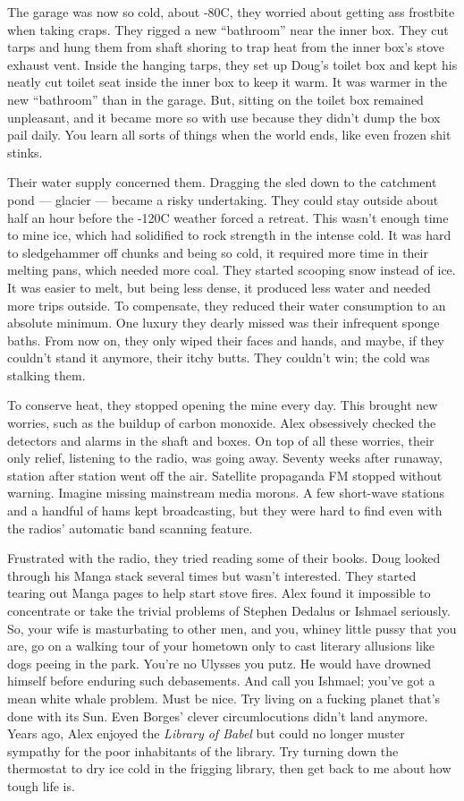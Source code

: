 The garage was now so cold, about -80C, they worried about getting ass
frostbite when taking craps. They rigged a new ``bathroom'' near the
inner box. They cut tarps and hung them from shaft shoring to trap heat
from the inner box's stove exhaust vent. Inside the hanging tarps, they
set up Doug's toilet box and kept his neatly cut toilet seat inside the
inner box to keep it warm. It was warmer in the new ``bathroom'' than in
the garage. But, sitting on the toilet box remained unpleasant, and it
became more so with use because they didn't dump the box pail daily. You
learn all sorts of things when the world ends, like even frozen shit
stinks.

Their water supply concerned them. Dragging the sled down to the
catchment pond --- glacier --- became a risky undertaking. They could
stay outside about half an hour before the -120C weather forced a
retreat. This wasn't enough time to mine ice, which had solidified to
rock strength in the intense cold. It was hard to sledgehammer off
chunks and being so cold, it required more time in their melting pans,
which needed more coal. They started scooping snow instead of ice. It
was easier to melt, but being less dense, it produced less water and
needed more trips outside. To compensate, they reduced their water
consumption to an absolute minimum. One luxury they dearly missed was
their infrequent sponge baths. From now on, they only wiped their faces
and hands, and maybe, if they couldn't stand it anymore, their itchy
butts. They couldn't win; the cold was stalking them.

To conserve heat, they stopped opening the mine every day. This brought
new worries, such as the buildup of carbon monoxide. Alex obsessively
checked the detectors and alarms in the shaft and boxes. On top of all
these worries, their only relief, listening to the radio, was going
away. Seventy weeks after runaway, station after station went off the
air. Satellite propaganda FM stopped without warning. Imagine missing
mainstream media morons. A few short-wave stations and a handful of hams
kept broadcasting, but they were hard to find even with the radios'
automatic band scanning feature.

Frustrated with the radio, they tried reading some of their books. Doug
looked through his Manga stack several times but wasn't interested. They
started tearing out Manga pages to help start stove fires. Alex found it
impossible to concentrate or take the trivial problems of Stephen
Dedalus or Ishmael seriously. So, your wife is masturbating to other
men, and you, whiney little pussy that you are, go on a walking tour of
your hometown only to cast literary allusions like dogs peeing in the
park. You're no Ulysses you putz. He would have drowned himself before
enduring such debasements. And call you Ishmael; you've got a mean white
whale problem. Must be nice. Try living on a fucking planet that's done
with its Sun. Even Borges' clever circumlocutions didn't land anymore.
Years ago, Alex enjoyed the \emph{Library of Babel} but could no longer
muster sympathy for the poor inhabitants of the library. Try turning
down the thermostat to dry ice cold in the frigging library, then get
back to me about how tough life is.

